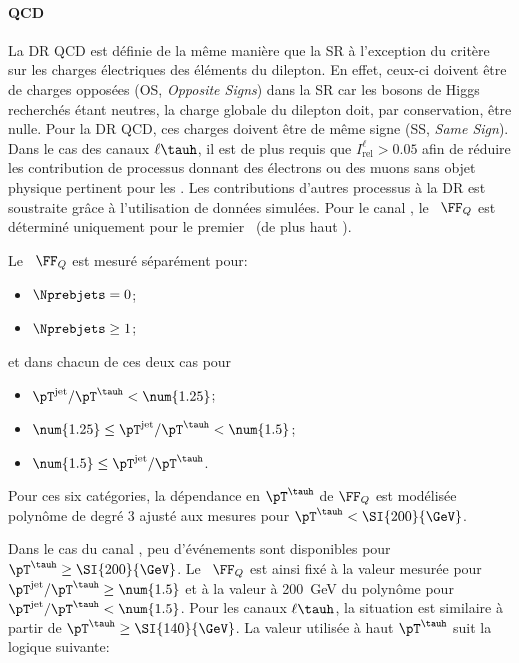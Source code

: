 \paragraph{QCD}
La DR QCD est définie de la même manière que la SR à l'exception du critère sur les charges électriques des éléments du dilepton.
En effet, ceux-ci doivent être de charges opposées (OS, \emph{Opposite Signs}) dans la SR car les bosons de Higgs recherchés étant neutres, la charge globale du dilepton doit, par conservation, être nulle.
Pour la DR QCD, ces charges doivent être de même signe (SS, \emph{Same Sign}).
Dans le cas des canaux $\ell\tauh$, il est de plus requis que $I_\text{rel}^{\ell} > \num{0.05}$ afin de réduire les contribution de processus donnant des électrons ou des muons sans objet physique pertinent pour les \fakefactors.
Les contributions d'autres processus à la DR est soustraite grâce à l'utilisation de données simulées.
Pour le canal \tauh\tauh, le \fakefactor\ $\FF_Q$ est déterminé uniquement pour le premier \tauh\ (de plus haut \pT).
\par
Le \fakefactor\ $\FF_Q$ est mesuré séparément pour:
\begin{itemize}
\item $\Nprebjets=0$;
\item $\Nprebjets\geq1$;
\end{itemize}
et dans chacun de ces deux cas pour
\begin{itemize}
\item $\pT^\text{jet}/\pT^{\tauh} < \num{1.25}$;
\item $\num{1.25} \leq \pT^\text{jet}/\pT^{\tauh} < \num{1.5}$;
\item $\num{1.5} \leq \pT^\text{jet}/\pT^{\tauh}$.
\end{itemize}
Pour ces six catégories, la dépendance en $\pT^{\tauh}$ de $\FF_Q$ est modélisée polynôme de degré 3 ajusté aux mesures pour $\pT^{\tauh}<\SI{200}{\GeV}$.
\par
Dans le cas du canal \tauh\tauh, peu d'événements sont disponibles pour $\pT^{\tauh}\geq\SI{200}{\GeV}$.
Le \fakefactor\ $\FF_Q$ est ainsi fixé à la valeur mesurée pour $\pT^\text{jet}/\pT^{\tauh} \geq \num{1.5}$ et à la valeur à \SI{200}{\GeV} du polynôme pour $\pT^\text{jet}/\pT^{\tauh} < \num{1.5}$.
Pour les canaux $\ell\tauh$, la situation est similaire à partir de $\pT^{\tauh}\geq\SI{140}{\GeV}$.
La valeur utilisée à haut $\pT^{\tauh}$ suit la logique suivante:
